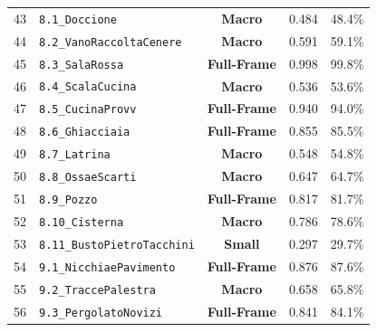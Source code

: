 \begin{longtable}{cp{5.6cm}ccc}
43 & \texttt{8.1\_Doccione} & \textbf{Macro} & 0.484 & 48.4\% \\
44 & \texttt{8.2\_VanoRaccoltaCenere} & \textbf{Macro} & 0.591 & 59.1\% \\
45 & \texttt{8.3\_SalaRossa} & \textbf{Full-Frame} & 0.998 & 99.8\% \\
46 & \texttt{8.4\_ScalaCucina} & \textbf{Macro} & 0.536 & 53.6\% \\
47 & \texttt{8.5\_CucinaProvv} & \textbf{Full-Frame} & 0.940 & 94.0\% \\
48 & \texttt{8.6\_Ghiacciaia} & \textbf{Full-Frame} & 0.855 & 85.5\% \\
49 & \texttt{8.7\_Latrina} & \textbf{Macro} & 0.548 & 54.8\% \\
50 & \texttt{8.8\_OssaeScarti} & \textbf{Macro} & 0.647 & 64.7\% \\
51 & \texttt{8.9\_Pozzo} & \textbf{Full-Frame} & 0.817 & 81.7\% \\
52 & \texttt{8.10\_Cisterna} & \textbf{Macro} & 0.786 & 78.6\% \\
53 & \texttt{8.11\_BustoPietroTacchini} & \textbf{Small} & 0.297 & 29.7\% \\
54 & \texttt{9.1\_NicchiaePavimento} & \textbf{Full-Frame} & 0.876 & 87.6\% \\
55 & \texttt{9.2\_TraccePalestra} & \textbf{Macro} & 0.658 & 65.8\% \\
56 & \texttt{9.3\_PergolatoNovizi} & \textbf{Full-Frame} & 0.841 & 84.1\% \\
\end{longtable}
\endgroup
